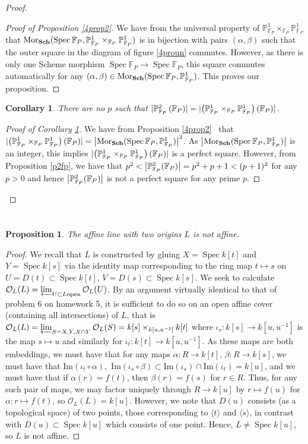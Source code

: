 \documentclass[english,letter,doublesided]{article}
\DeclareMathOperator{\spec}{Spec}
\newcommand{\mor}{\mathrm{Mor}}
\DeclarePairedDelimiter\abs{\lvert}{\rvert}%
\newcommand{\OO}{\mathcal{O}}
\newcommand{\FF}{\mathbb{F}}
\newcommand{\PP}{\mathbb{P}}
\newenvironment{subproof}[1][\proofname]{%
	\renewcommand{\qedsymbol}{$\blacksquare$}%
	\begin{proof}[#1]%
	}{%
	\end{proof}%
}
\newcommand{\prob}[1]{\setcounter{section}{#1-1}\section{}}
\newtheorem{cor}[thm]{Corollary}
\newtheorem*{prop*}{Proposition}
\theoremstyle{remark}
\theoremstyle{definition}
\newcommand{\im}{\mathrm{Im}}
\newcommand{\cat}[1]{{\mathrm{\bf{#1}}}}
\newcommand{\clim}{\varprojlim}
\newcommand{\Fp}{{\FF_P}}
\begin{document}
\begin{proof}
\begin{subproof}[Proof of Proposition \ref{4prop2}]
We have from the universal property of $\PP^1_\Fp\times_\Fp\PP^1_\Fp$ that $\mor_{\cat{Sch}}(\spec \Fp,\PP^1_\Fp\times_\Fp\PP^1_\Fp)$ is in bijection with pairs $(\alpha,\beta)$ such that the outer square in the diagram of figure \ref{4proun} commutes. However, as there is only one Scheme morphism $\spec \Fp\to \spec \Fp$, this square commutes automatically for any $(\alpha,\beta)\in \mor_{\cat{Sch}}(\spec\Fp,\PP^1_\Fp)$. This proves our proposition.
\end{subproof}
\begin{cor}\label{4nop}
	There are no $p$ such that  $\abs{\PP_{\Fp}^2\left(\Fp\right)}=\abs{\left(\PP^1_\Fp\times_\Fp\PP^1_\Fp\right)(\Fp)}$.
\end{cor}
\begin{subproof}[Proof of Corollary \ref{4nop}]
	We have from Proposition \ref{4prop2}~ that $\abs{\left(\PP^1_\Fp\times_\Fp\PP^1_\Fp\right)(\Fp)}=\abs*{\mor_{\cat{Sch}}(\spec\Fp,\PP^1_\Fp)}^2$. As $\abs*{\mor_{\cat{Sch}}(\spec\Fp,\PP^1_\Fp)}$ is an integer, this implies $\abs{\left(\PP^1_\Fp\times_\Fp\PP^1_\Fp\right)(\Fp)}$ is a perfect square. However, from Proposition \ref{p2fp}, we have that $p^2<\abs*{\PP^2_\Fp(\Fp)}=p^2+p+1<(p+1)^2$ for any $p>0$ and hence $\abs*{\PP^2_\Fp(\Fp)}$ is not a perfect square for any prime $p$.
\end{subproof}
\end{proof}
%
%
%
\prob{5}
%
%
%
\prob{6}
\begin{prop*}
	The affine line with two origins $L$ is not affine.
\end{prop*}
\begin{proof}
	We recall that $L$ is constructed by gluing $X=\spec k[t]$ and $Y=\spec k[s]$ via the identity map corresponding to the ring map $t\mapsto s$ on $U=D(t)\subset \spec k[t]$, $V= D(s)\subset \spec k[s]$. We seek to calculate $\OO_{L}(L)=\clim_{U\subset L \text{open}}\OO_L(U)$. By an argument virtually identical to that of problem 6 on homework 5, it is sufficient to do so on an open affine cover (containing all intersections) of $L$, that is $\OO_L(L)=\clim_{S=X,Y,X\cap Y}\OO_L(S)=k[s]\times_{k[u,u^{-1}]} k[t]$ where $\iota_s:k[s]\to k[u,u^{-1}]$ is the map $s\mapsto u$ and similarly for $\iota_t:k[t]\to k[u,u^{-1}]$. As these maps are both embeddings, we must have that for any maps $\alpha:R\to k[t]$, $\beta:R\to k[s]$, we must have that $\im(\iota_t\circ \alpha),$ $\im (\iota_s\circ \beta)\subset \im (\iota_s)\cap \im (\iota_t)=k[u]$, and we must have that if $\alpha(r)=f(t)$, then $\beta(r)=f(s)$ for $r\in R$. Thus, for any such pair of maps, we may factor uniquely through $R\to k[u]$ by $r\mapsto f(u)$ for $\alpha:r\mapsto f(t)$, so $\OO_L(L)=k[u]$. However, we note that $D(u)$ consists (as a topological space) of two points, those corresponding to $\langle t \rangle $ and $\langle s \rangle$, in contrast with $D(u)\subset \spec k[u]$ which consists of one point. Hence, $L\neq \spec k[u]$, so $L$ is not affine.
\end{proof}
\end{document}
